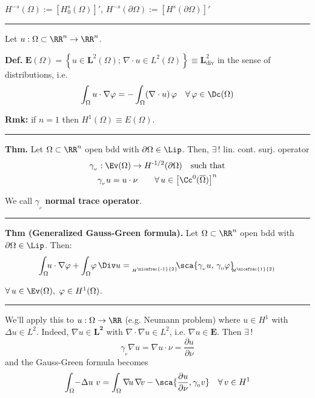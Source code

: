 
$H^{-s}(\Omega):=\left[ H^s_0(\Omega) \right]'$, $H^{-s}(\partial\Omega):=\left[ H^s(\partial\Omega) \right]'$

\rule{0.31\textwidth}{0.2pt}
\smallskip

Let $u:\Omega\subset\RR^n\to\RR^n$.

\smallskip

\textbf{Def.} $\mathbf{E}(\Omega)=\left\{ u\in \mathbf{L}^2(\Omega);\, \nabla\!\!\cdot\! u \in L^2(\Omega) \right\}\equiv \mathbf{L}^2_{\text{div}}$ in the sense of distributions, i.e.
\begin{equation*}
\int_\Omega u\cdot \nabla\varphi=-\int_\Omega (\nabla\cdot u)\, \varphi\quad\forall\,\varphi\in\Dc(\Omega)
\end{equation*}

\smallskip

\textbf{Rmk:} if $n=1$ then $H^1(\Omega)\equiv E(\Omega)$.

\rule{0.31\textwidth}{0.2pt}
\smallskip

\textbf{Thm.} Let $\Omega\subset\RR^n$ open bdd with $\partial\Omega\in\Lip$. Then, $\exists\,!$ lin. cont. surj. operator 
\begin{gather*}
\gamma_{_\nu}:\Ev(\Omega)\to H^{\text{-}1/2}(\partial\Omega)\quad\text{such that} \\
\gamma_{_\nu} u=u\cdot\nu\qquad\forall\, u\in\left[\Cc^0(\overline{\Omega})\right]^n
\end{gather*}

We call $\gamma_{_\nu}$ \textbf{normal trace operator}.

\rule{0.31\textwidth}{0.2pt}
\smallskip

\textbf{Thm (Generalized Gauss-Green formula).} Let $\Omega\subset\RR^n$ open bdd with $\partial\Omega\in\Lip$. Then:
\begin{equation*}
\int_\Omega\!\! u\cdot\nabla\varphi+\int_\Omega\!\varphi\,\Div u={}_{_{H^{\nicefrac{\text{-}1}{2}}}}\!\!\sca{\gamma_{_\nu} u,\,\gamma_{_0}\varphi}\!\!{}_{_{H^{\nicefrac{1}{2}}}}
\end{equation*}

$\forall\, u\in\Ev(\Omega),\ \varphi\in H^1(\Omega)$.

\rule{0.31\textwidth}{0.2pt}
\smallskip

We'll apply this to $u:\Omega\to\RR$ (e.g. Neumann problem) where $u\in H^1$ with $\Delta u\in L^2$. Indeed, $\nabla u \in \mathbf{L^2}$ with $\nabla\!\cdot\!\nabla u \in L^2$, i.e. $\nabla u \in \mathbf{E}$. Then $\exists\, !$
\begin{equation*}
\gamma_{_\nu} \nabla u=\nabla u \cdot \nu = \frac{\partial u}{\partial \nu} 
\end{equation*}
and the Gauss-Green formula becomes
\begin{equation*}
\int_\Omega\!- \Delta u\ v=\int_\Omega \nabla\! u\,\nabla\! v -\sca{\frac{\partial u}{\partial \nu}, \gamma_{_0} v}\quad\forall\, v\in H^1
\end{equation*}

